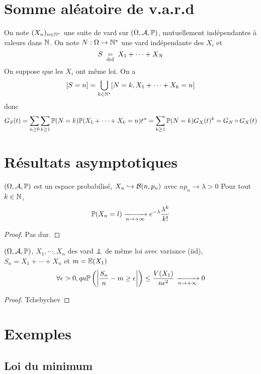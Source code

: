 \section{Somme aléatoire de v.a.r.d}

On note $(X_n)_{n\in \N^\star}$ une suite de vard sur $(\Omega, \mathcal  A, \P)$, mutuellement indépendantes à valeurs dans $\N$. On note $N:\Omega\to \N^\star$ une vard indépendante des $X_i$ et  \[
    S\defeq X_1+\cdots +X_N
\] 
On suppose que les $X_i$ ont même loi. On a  \[
    [S=n]=\bigcup_{k \in  \N^\star}[N=k,X_1+\cdots +X_k=n]
\] 
donc \[
    G_S(t)= \sum_{n\geq 0}\sum_{k\geq 1} \P(N=k)\P(X_1+\cdots +X_k=n)t^n=\sum_{k\geq 1}\P(N=k)G_X(t)^k =G_N\circ G_X(t)
\] 

\section{Résultats asymptotiques}

\begin{prop}
    \Hyp $(\Omega, \mathcal  A, \P)$ est un espace probabilisé, $X_n\suit \mathcal  B(n, p_n)$ avec $np_n \to  \lambda>0$
    \Conc Pour tout $ k\in \N$, \[
        \P(X_n=l) \xrightarrow[n\to+\infty]{}e^{-\lambda}\frac{\lambda^k}{k!}
    \]
\end{prop}

\begin{proof}
    Pas dur.
\end{proof}

\begin{thm}
    \Hyp $(\Omega, \mathcal  A, \P)$, $X_1,\cdots , X_n$ des vard $\indep$ de même loi avec variance (iid\footnotemark), $S_n=X_1+\cdots +X_n$ et $m=\E(X_1)$
    \Conc \[
        \forall  \epsilon>0,qa\P\left( \left| \frac{S_n}{n}-m\geq \epsilon \right| \right) \leq \frac{V(X_1)}{n\epsilon^2} \xrightarrow[n\to+\infty]{}0
    \] 
\end{thm}

\begin{proof}
Tchebychev
\end{proof}

\section{Exemples}

\subsection{Loi du minimum}

